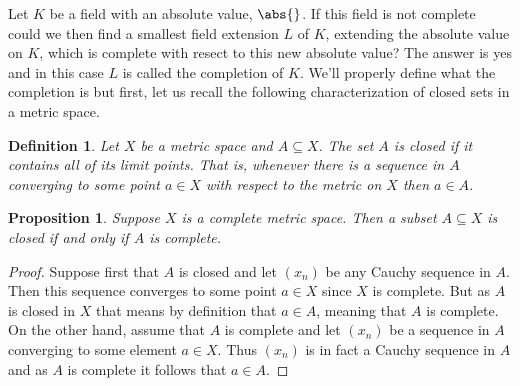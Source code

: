 \documentclass{article}
\newtheorem{definition}{Definition}[section]
\newtheorem{proposition}{Proposition}[section]
\numberwithin{equation}{section}
\begin{document}
Let $K$ be a field with an absolute value, $\abs{}$. If this field is not complete could we then find a smallest field extension $L$ of $K$, extending the absolute value on $K$, which is complete with resect to this new absolute value? The answer is yes and in this case $L$ is called the completion of $K$. We'll properly define what the completion is but first, let us recall the following characterization of closed sets in a metric space.

\begin{definition}
    Let $X$ be a metric space and $A \subseteq X$. The set $A$ is closed if it contains all of its limit points. That is, whenever there is a sequence in $A$ converging to some point $a \in X$ with respect to the metric on $X$ then $a \in A$.
\end{definition}

\begin{proposition}
    Suppose $X$ is a complete metric space. Then a subset $A \subseteq X$ is closed if and only if $A$ is complete.
\end{proposition}
\begin{proof}
    Suppose first that $A$ is closed and let $(x_n)$ be any Cauchy sequence in $A$. Then this sequence converges to some point $a \in X$ since $X$ is complete. But as $A$ is closed in $X$ that means by definition that $a \in A$, meaning that $A$ is complete. On the other hand, assume that $A$ is complete and let $(x_n)$ be a sequence in $A$ converging to some element $a \in X$. Thus $(x_n)$ is in fact a Cauchy sequence in $A$ and as $A$ is complete it follows that $a \in A$.
\end{proof}
\end{document}
